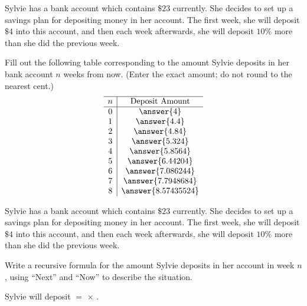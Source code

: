 \documentclass[nooutcomes]{ximera}
\begin{document}
\begin{problem}
Sylvie has a bank account which contains $\$23$ currently.  She decides to set up a savings plan for depositing money in her account.  The first week, she will deposit $\$4$ into this account, and then each week afterwards, she will deposit $10\%$ more than she did the previous week.  

Fill out the following table corresponding to the amount Sylvie deposits in her bank account $n$ weeks from now. (Enter the exact amount; do not round to the nearest cent.)
\[
\begin{array}{c|c} \hline
n & \text{Deposit Amount} \\ \hline
0 & \answer{4}\\
1 & \answer{4.4} \\
2 & \answer{4.84} \\
3 & \answer{5.324}\\
4 & \answer{5.8564}\\
5 & \answer{6.44204}\\
6 & \answer{7.086244}\\
7 & \answer{7.7948684}\\
8 & \answer{8.57435524}\\
\end{array}
\]


\end{problem}



\begin{problem}
Sylvie has a bank account which contains $\$23$ currently.  She decides to set up a savings plan for depositing money in her account.  The first week, she will deposit $\$4$ into this account, and then each week afterwards, she will deposit $10\%$ more than she did the previous week.  


Write a recursive formula for the amount Sylvie deposits in her account in week $n$, using ``Next'' and ``Now'' to describe the situation.

\begin{prompt}
Sylvie will deposit  $=$   $\times$  .
\end{prompt}

\end{problem}
\end{document}
